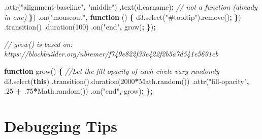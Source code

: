 \documentclass[openany]{book}
\newenvironment{Shaded}{\begin{snugshade}}{\end{snugshade}}
\newcommand{\AttributeTok}[1]{\textcolor[rgb]{0.77,0.63,0.00}{#1}}
\newcommand{\CommentTok}[1]{\textcolor[rgb]{0.56,0.35,0.01}{\textit{#1}}}
\newcommand{\DecValTok}[1]{\textcolor[rgb]{0.00,0.00,0.81}{#1}}
\newcommand{\FloatTok}[1]{\textcolor[rgb]{0.00,0.00,0.81}{#1}}
\newcommand{\KeywordTok}[1]{\textcolor[rgb]{0.13,0.29,0.53}{\textbf{#1}}}
\newcommand{\NormalTok}[1]{#1}
\newcommand{\OperatorTok}[1]{\textcolor[rgb]{0.81,0.36,0.00}{\textbf{#1}}}
\newcommand{\StringTok}[1]{\textcolor[rgb]{0.31,0.60,0.02}{#1}}
\newcommand{\VariableTok}[1]{\textcolor[rgb]{0.00,0.00,0.00}{#1}}
\begin{document}
\begin{Shaded}
\begin{Highlighting}[]
\NormalTok{         .}\AttributeTok{attr}\NormalTok{(}\StringTok{"alignment-baseline"}\OperatorTok{,} \StringTok{"middle"}\NormalTok{)}
\NormalTok{         .}\AttributeTok{text}\NormalTok{(}\VariableTok{d}\NormalTok{.}\AttributeTok{carname}\NormalTok{)}\OperatorTok{;}  \CommentTok{// not a function (already in one)}
     \OperatorTok{\}}\NormalTok{)}
\NormalTok{     .}\AttributeTok{on}\NormalTok{(}\StringTok{"mouseout"}\OperatorTok{,} \KeywordTok{function}\NormalTok{ () }\OperatorTok{\{}
       \VariableTok{d3}\NormalTok{.}\AttributeTok{select}\NormalTok{(}\StringTok{"#tooltip"}\NormalTok{).}\AttributeTok{remove}\NormalTok{()}\OperatorTok{;}
     \OperatorTok{\}}\NormalTok{)}
\NormalTok{     .}\AttributeTok{transition}\NormalTok{()}
\NormalTok{     .}\AttributeTok{duration}\NormalTok{(}\DecValTok{100}\NormalTok{)}
\NormalTok{     .}\AttributeTok{on}\NormalTok{(}\StringTok{"end"}\OperatorTok{,}\NormalTok{ grow)}\OperatorTok{;}
  \OperatorTok{\}}\NormalTok{)}\OperatorTok{;}

\CommentTok{// grow() is based on: https://blockbuilder.org/nbremer/f749e822f33e422f2b5a7d541e5691cb}

\KeywordTok{function} \AttributeTok{grow}\NormalTok{() }\OperatorTok{\{}
    \CommentTok{//Let the fill opacity of each circle vary randomly}
    \VariableTok{d3}\NormalTok{.}\AttributeTok{select}\NormalTok{(}\KeywordTok{this}\NormalTok{)}
\NormalTok{        .}\AttributeTok{transition}\NormalTok{().}\AttributeTok{duration}\NormalTok{(}\DecValTok{2000}\OperatorTok{*}\VariableTok{Math}\NormalTok{.}\AttributeTok{random}\NormalTok{())}
\NormalTok{        .}\AttributeTok{attr}\NormalTok{(}\StringTok{"fill-opacity"}\OperatorTok{,} \FloatTok{.25} \OperatorTok{+} \FloatTok{.75}\OperatorTok{*}\VariableTok{Math}\NormalTok{.}\AttributeTok{random}\NormalTok{())}
\NormalTok{        .}\AttributeTok{on}\NormalTok{(}\StringTok{"end"}\OperatorTok{,}\NormalTok{ grow)}\OperatorTok{;}
\OperatorTok{\};}
\end{Highlighting}
\end{Shaded}

\hypertarget{debugging-tips}{%
\chapter{Debugging Tips }\label{debugging-tips}}
\end{document}
